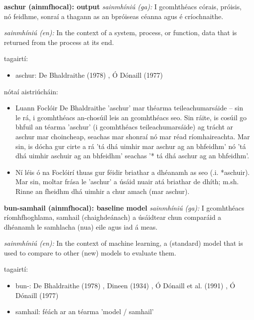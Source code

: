 \documentclass{article}
\begin{document}
\textbf{aschur (ainmfhocal): output}
\textit{sainmhíniú (ga):} I gcomhthéacs córais, próisis, nó feidhme, sonraí a thagann as an bpróiseas céanna agus é críochnaithe.

\textit{sainmhíniú (en):} In the context of a system, process, or function, data that is returned from the process at its end.

tagairtí:
\begin{itemize}
	\item aschur: De Bhaldraithe (1978) \cite{de-bhaldraithe}, Ó Dónaill (1977) \cite{odonaill}
\end{itemize}

nótaí aistriúcháin:
\begin{itemize}
	\item Luann Foclóir De Bhaldraithe 'aschur' mar théarma teileachumarsáide -- sin le rá, i gcomhthéacs an-chosúil leis an gcomhthéacs seo. Sin ráite, is cosúil go bhfuil an téarma 'aschur' (i gcomhthéacs teileachumarsáide) ag trácht ar aschur mar choincheap, seachas mar shonraí nó mar réad ríomhaireachta. Mar sin, is dócha gur cirte a rá 'tá dhá uimhir mar aschur ag an bhfeidhm' nó 'tá dhá uimhir aschuir ag an bhfeidhm' seachas '* tá dhá aschur ag an bhfeidhm'.
	\item Ní léis ó na Foclóirí thuas gur féidir briathar a dhéanamh as seo (.i. *aschuir). Mar sin, moltar frása le 'aschur' a úsáid nuair atá briathar de dhíth; m.sh. Rinne an fheidhm dhá uimhir a chur amach (mar aschur).
\end{itemize}


\textbf{bun-samhail (ainmfhocal): baseline model}
\textit{sainmhíniú (ga):} I gcomhthéacs ríomhfhoghlama, samhail (chaighdeánach) a úsáidtear chun comparáid a dhéanamh le samhlacha (nua) eile agus iad á meas.

\textit{sainmhíniú (en):} In the context of machine learning, a (standard) model that is used to compare to other (new) models to evaluate them.

tagairtí:
\begin{itemize}
	\item bun-: De Bhaldraithe (1978) \cite{de-bhaldraithe}, Dineen (1934) \cite{dineen}, Ó Dónaill et al. (1991) \cite{focloir-beag}, Ó Dónaill (1977) \cite{odonaill}
	\item samhail: féách ar an téarma 'model / samhail'
\end{itemize}
\end{document}
